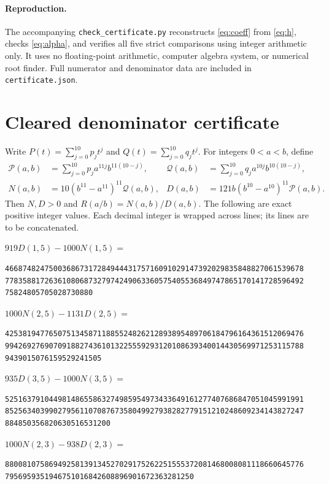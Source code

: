 \documentclass[11pt]{article}
\begin{document}
\paragraph{Reproduction.}
The accompanying \texttt{check\_certificate.py} reconstructs \eqref{eq:coeff}
from \eqref{eq:h}, checks \eqref{eq:alpha}, and verifies all five strict comparisons
using integer arithmetic only. It uses no floating-point arithmetic, computer
algebra system, or numerical root finder. Full numerator and denominator data
are included in \texttt{certificate.json}.

\newpage
\appendix
\section{Cleared denominator certificate}
Write $P(t)=\sum_{j=0}^{10}p_jt^j$ and $Q(t)=\sum_{j=0}^{10}q_jt^j$.
For integers $0<a<b$, define
\begin{align*}
\mathcal P(a,b)&=\sum_{j=0}^{10}p_j a^{11j}b^{11(10-j)},&
\mathcal Q(a,b)&=\sum_{j=0}^{10}q_j a^{10j}b^{10(10-j)},\\
N(a,b)&=10(b^{11}-a^{11})^{11}\mathcal Q(a,b),&
D(a,b)&=121b(b^{10}-a^{10})^{11}\mathcal P(a,b).
\end{align*}
Then $N,D>0$ and $R(a/b)=N(a,b)/D(a,b)$. The following are exact positive
integer values. Each decimal integer is wrapped across lines; its lines are to
be concatenated.

\noindent $919D(1,5)-1000N(1,5)=$
\begin{Verbatim}[fontsize=\footnotesize]
46687482475003686731728494443175716091029147392029835848827061539678
77835881726361080687327974249063360575405536849747865170141728596492
75824805705028730880
\end{Verbatim}

\noindent $1000N(2,5)-1131D(2,5)=$
\begin{Verbatim}[fontsize=\footnotesize]
42538194776507513458711885524826212893895489706184796164361512069476
99426927690709188274361013225559293120108639340014430569971253115788
9439015076159529241505
\end{Verbatim}

\noindent $935D(3,5)-1000N(3,5)=$
\begin{Verbatim}[fontsize=\footnotesize]
52516379104498148655863274985954973433649161277407686847051045991991
85256340399027956110708767358049927938282779151210248609234143827247
884850356820630516531200
\end{Verbatim}

\noindent $1000N(2,3)-938D(2,3)=$
\begin{Verbatim}[fontsize=\footnotesize]
88008107586949258139134527029175262251555372081468008081118660645776
7956959351946751016842608896901672363281250
\end{Verbatim}
\end{document}
